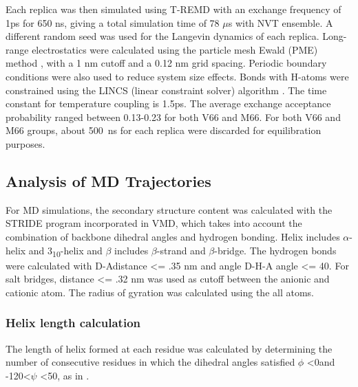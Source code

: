 \documentclass[10pt,letterpaper]{article}
\begin{document}
Each replica was then simulated using T-REMD \cite{Sugita1999a} with an exchange frequency of 1ps for 650 ns, giving a total simulation time of 78 $\mu$s with NVT ensemble. A different random seed was used for the Langevin dynamics of each replica. Long-range electrostatics were calculated using the particle mesh Ewald (PME) method \cite {Essmann1995}, with a 1 nm cutoff and a 0.12 nm grid spacing. Periodic boundary conditions were also used to reduce system size effects. Bonds with H-atoms were constrained using the LINCS (linear constraint solver) algorithm \cite {Hess1997}. The time constant for temperature coupling is 1.5ps. The average exchange acceptance probability ranged between 0.13-0.23 for both V66 and M66. For both V66 and M66 groups, about 500~ns for each replica were discarded for equilibration purposes. 

\subsection*{Analysis of MD Trajectories} For MD simulations, the secondary structure content was  calculated with the STRIDE program incorporated in VMD,\cite{Humphrey1996}  which takes into account the combination of backbone dihedral angles and hydrogen bonding. Helix includes $\alpha$-helix and 3\textsubscript{10}-helix and $\beta$ includes $\beta$-strand and $\beta$-bridge. The hydrogen bonds were calculated with \textbar  D-A\textbar  distance \textless = .35 nm and angle D-H-A angle \textless= 40\textdegree. For salt bridges, distance \textless = .32 nm was used as cutoff between the anionic and cationic atom. The radius of gyration was calculated using the all atoms.

\subsubsection*{Helix length calculation} The length of helix formed at each residue was calculated by determining the number of consecutive residues in which the dihedral angles satisfied $\phi$ \textless 0\textdegree and -120\textdegree\textless $\psi$ \textless 50\textdegree, as in \cite{Nodet,Iglesias2013}.
\end{document}
